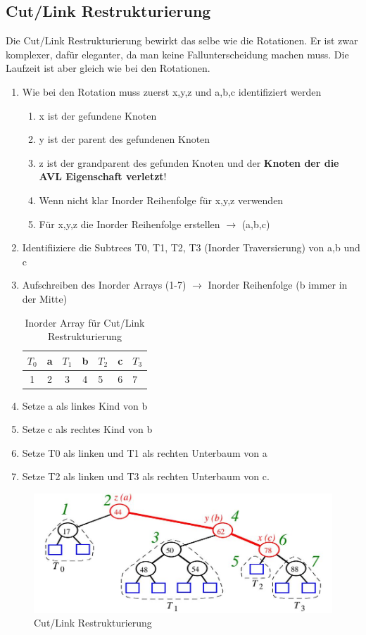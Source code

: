 \subsection{Cut/Link Restrukturierung}
Die Cut/Link Restrukturierung bewirkt das selbe wie die Rotationen. Er ist zwar komplexer, dafür eleganter, da man keine Fallunterscheidung machen muss. Die Laufzeit ist aber gleich wie bei den Rotationen.
\begin{enumerate}
	\item Wie bei den Rotation muss zuerst x,y,z und a,b,c identifiziert werden
	\begin{enumerate}
		\item x ist der gefundene Knoten
		\item y ist der parent des gefundenen Knoten
		\item z ist der grandparent des gefunden Knoten und der \textbf{Knoten der die AVL Eigenschaft verletzt}!
		\item Wenn nicht klar Inorder Reihenfolge für x,y,z verwenden
		\item Für x,y,z die Inorder Reihenfolge erstellen $\rightarrow$ (a,b,c)
	\end{enumerate}
	\item Identifiiziere die Subtrees T0, T1, T2, T3 (Inorder Traversierung) von a,b und c
	\item Aufschreiben des Inorder Arrays (1-7) $\rightarrow$ Inorder Reihenfolge (b immer in der Mitte)
	\begin{table}[h]
		\centering
		\begin{tabu} to \linewidth {| c | c | c | c | l | l | l |}
			\toprule
			$T_0$ & a & $T_1$ & b & $T_2$ & c & $T_3$ \\  & 2 & 3 & 4 & 5 & 6 & 7 \\
			\bottomrule
		\end{tabu}
		\caption{Inorder Array für Cut/Link Restrukturierung}
	\end{table}
	\item Setze a als linkes Kind von b
	\item Setze c als rechtes Kind von b
	\item Setze T0 als linken und  T1 als rechten Unterbaum von a
	\item Setze T2 als linken  und T3 als rechten Unterbaum von c.
\end{enumerate}


\begin{figure}[h]
\centering
\includegraphics[width=0.8\linewidth]{images/cut_link_restruction}
\caption{Cut/Link Restrukturierung}
\label{fig:cutlinkrestruction}
\end{figure}

